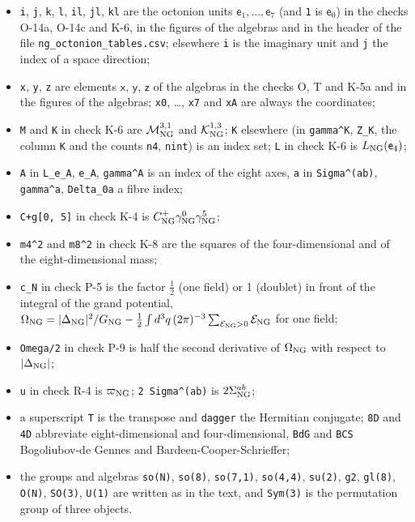 \documentclass[
  10pt,
]{article}
\providecommand{\tightlist}{%
  \setlength{\itemsep}{0pt}\setlength{\parskip}{0pt}}
\begin{document}
\begin{itemize}
\tightlist
\item
  \texttt{i}, \texttt{j}, \texttt{k}, \texttt{l}, \texttt{il},
  \texttt{jl}, \texttt{kl} are the octonion units
  \(\mathsf e_1,\dots,\mathsf e_7\) (and \texttt{1} is \(\mathsf e_0\))
  in the checks O-14a, O-14c and K-6, in the figures of the algebras and
  in the header of the file \texttt{ng\_octonion\_tables.csv}; elsewhere
  \texttt{i} is the imaginary unit and \texttt{j} the index of a space
  direction;
\item
  \texttt{x}, \texttt{y}, \texttt{z} are elements \(\mathsf x\),
  \(\mathsf y\), \(\mathsf z\) of the algebras in the checks O, T and
  K-5a and in the figures of the algebras; \texttt{x0}, \ldots,
  \texttt{x7} and \texttt{xA} are always the coordinates;
\item
  \texttt{M} and \texttt{K} in check K-6 are
  \(\mathcal M^{3,1}_{\rm NG}\) and \(\mathcal K^{1,3}_{\rm NG}\);
  \texttt{K} elsewhere (in \texttt{gamma\^{}K}, \texttt{Z\_K}, the
  column \texttt{K} and the counts \texttt{n4}, \texttt{nint}) is an
  index set; \texttt{L} in check K-6 is \(L_{\rm NG}(\mathsf e_4)\);
\item
  \texttt{A} in \texttt{L\_e\_A}, \texttt{e\_A}, \texttt{gamma\^{}A} is
  an index of the eight axes, \texttt{a} in \texttt{Sigma\^{}(ab)},
  \texttt{gamma\^{}a}, \texttt{Delta\_0a} a fibre index;
\item
  \texttt{C+g{[}0,\ 5{]}} in check K-4 is
  \(C^+_{\rm NG}\gamma^0_{\rm NG}\gamma^5_{\rm NG}\);
\item
  \texttt{m4\^{}2} and \texttt{m8\^{}2} in check K-8 are the squares of
  the four-dimensional and of the eight-dimensional mass;
\item
  \texttt{c\_N} in check P-5 is the factor \(\tfrac12\) (one field) or 1
  (doublet) in front of the integral of the grand potential,
  \(\Omega_{\rm NG}=\lvert\Delta_{\rm NG}\rvert^2/G_{\rm NG}-\tfrac12\int d^3q\,(2\pi)^{-3}\sum_{\mathcal E_{\rm NG}>0}\mathcal E_{\rm NG}\)
  for one field;
\item
  \texttt{Omega\textquotesingle{}\textquotesingle{}/2} in check P-9 is
  half the second derivative of \(\Omega_{\rm NG}\) with respect to
  \(\lvert\Delta_{\rm NG}\rvert\);
\item
  \texttt{u} in check R-4 is \(\varpi_{\rm NG}\);
  \texttt{2\ Sigma\^{}(ab)} is \(2\Sigma^{ab}_{\rm NG}\);
\item
  a superscript \texttt{T} is the transpose and \texttt{dagger} the
  Hermitian conjugate; \texttt{8D} and \texttt{4D} abbreviate
  eight-dimensional and four-dimensional, \texttt{BdG} and \texttt{BCS}
  Bogoliubov-de Gennes and Bardeen-Cooper-Schrieffer;
\item
  the groups and algebras \texttt{so(N)}, \texttt{so(8)},
  \texttt{so(7,1)}, \texttt{so(4,4)}, \texttt{su(2)}, \texttt{g2},
  \texttt{gl(8)}, \texttt{O(N)}, \texttt{SO(3)}, \texttt{U(1)} are
  written as in the text, and \texttt{Sym(3)} is the permutation group
  of three objects.
\end{itemize}
\end{document}
